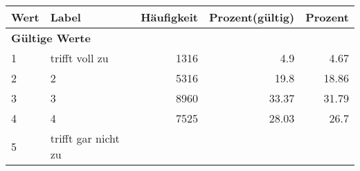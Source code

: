      \begin{longtable}{lXrrr}
     \toprule
     \textbf{Wert} & \textbf{Label} & \textbf{Häufigkeit} & \textbf{Prozent(gültig)} & \textbf{Prozent} \\
     \endhead
     \midrule
     \multicolumn{5}{l}{\textbf{Gültige Werte}}\\

     1 &
     \multicolumn{1}{X}{ trifft voll zu   } &


       \num{1316} &
       \num[round-mode=places,round-precision=2]{4.9} &
         \num[round-mode=places,round-precision=2]{4.67} \\

     2 &
     \multicolumn{1}{X}{ 2   } &


       \num{5316} &
       \num[round-mode=places,round-precision=2]{19.8} &
         \num[round-mode=places,round-precision=2]{18.86} \\

     3 &
     \multicolumn{1}{X}{ 3   } &


       \num{8960} &
       \num[round-mode=places,round-precision=2]{33.37} &
         \num[round-mode=places,round-precision=2]{31.79} \\

     4 &
     \multicolumn{1}{X}{ 4   } &


       \num{7525} &
       \num[round-mode=places,round-precision=2]{28.03} &
         \num[round-mode=places,round-precision=2]{26.7} \\

     5 &
     \multicolumn{1}{X}{ trifft gar nicht zu   } &



\end{longtable}
